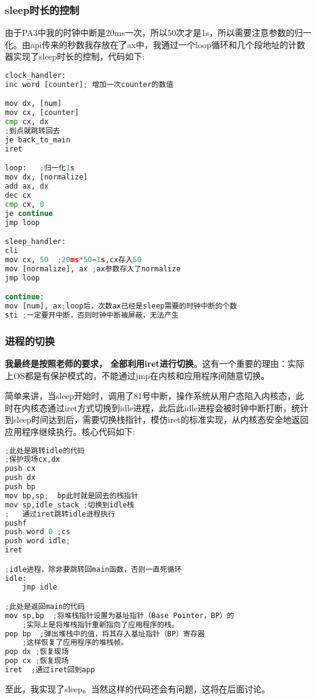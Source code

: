 \documentclass{LabReport}
\begin{document}
	\subsubsection{sleep时长的控制}
	由于PA3中我的时钟中断是20ms一次，所以50次才是1s，所以需要注意参数的归一化。由api传来的秒数我存放在了ax中，我通过一个loop循环和几个段地址的计数器实现了sleep时长的控制，代码如下:
\begin{lstlisting}[language=python,frame=shadowbox]
clock_handler:
inc word [counter]; 增加一次counter的数值

mov dx, [num]
mov cx, [counter]
cmp cx, dx
;到点就跳转回去
je back_to_main
iret

loop:   ;归一化1s
mov dx, [normalize]
add ax, dx
dec cx
cmp cx, 0
je continue
jmp loop

sleep_handler:
cli
mov cx, 50  ;20ms*50=1s,cx存入50
mov [normalize], ax	;ax参数存入了normalize
jmp loop

continue:
mov [num], ax;loop后，次数ax已经是sleep需要的时钟中断的个数
sti ;一定要开中断，否则时钟中断被屏蔽，无法产生
\end{lstlisting}
	\subsubsection{进程的切换}
	\textbf{我最终是按照老师的要求，{\color{red} 全部}利用iret进行切换}。这有一个重要的理由：实际上OS都是有保护模式的，不能通过jmp在内核和应用程序间随意切换。\par
	\hspace{0em}简单来讲，当sleep开始时，调用了81号中断，操作系统从用户态陷入内核态，此时在内核态通过iret方式切换到idle进程，此后此idle进程会被时钟中断打断，统计到sleep时间达到后，需要切换栈指针，模仿iret的标准实现，从内核态安全地返回应用程序继续执行。核心代码如下:
\begin{lstlisting}[language=python,frame=shadowbox]
;此处是跳转idle的代码
;保护现场cx,dx
push cx
push dx
push bp
mov bp,sp;  bp此时就是回去的栈指针
mov sp,idle_stack ;切换到idle栈
;   通过iret跳转idle进程执行
pushf
push word 0 ;cs
push word idle; 
iret

;idle进程，除非要跳转回main函数，否则一直死循环
idle:
	jmp idle

;此处是返回main的代码
mov sp,bp  ;将堆栈指针设置为基址指针（Base Pointer，BP）的
	;实际上是将堆栈指针重新指向了应用程序的栈。
pop bp  ;弹出堆栈中的值，将其存入基址指针（BP）寄存器
	;这样恢复了应用程序的堆栈帧。
pop dx ;恢复现场
pop cx ;恢复现场
iret  ;通过iret回到app

\end{lstlisting}
	至此，我实现了sleep。当然这样的代码还会有问题，这将在后面讨论。
	
\end{document}

